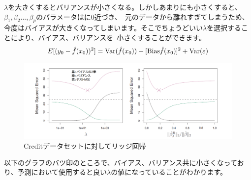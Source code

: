 \documentclass[uplatex]{jsarticle}
\begin{document}
$\lambda$を大きくするとバリアンスが小さくなる。しかしあまりにも小さくすると、$\beta_1, \beta_2..., \beta_p$のパラメータはに0近づき、\
元のデータから離れすぎてしまうため、今度はバイアスが大きくなってしまいます。そこでちょうどいい$\lambda$を選択することにより、バイアス、バリアンスを\
小さくすることができます。
\begin{equation}
  E[(y_0 - \hat{f}(x_0))^2] = {\rm Var}(\hat{f}(x_0)) + [{\rm Bias}\hat{f}(x_0)]^2 + {\rm Var}(\varepsilon)
\end{equation}
\begin{figure}
  \begin{center}
    \includegraphics[width=13cm]{img/lidge_lambda.png}
    \caption{Creditデータセットに対してリッジ回帰}
  \end{center}
\end{figure}
以下のグラフのバツ印のところで、バイアス、バリアンス共に小さくなっており、予測において使用すると良い$\lambda$の値になっていることがわかります。
\end{document}
